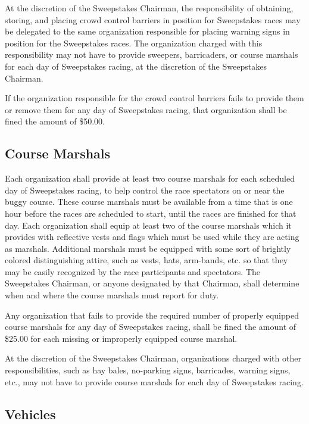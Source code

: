 	At the discretion of the Sweepstakes Chairman, the responsibility of obtaining, storing, and placing crowd control barriers in position for Sweepstakes races may be delegated to the same organization responsible for placing warning signs in position for the Sweepstakes races. The organization charged with this responsibility may not have to provide sweepers, barricaders, or course marshals for each day of Sweepstakes racing, at the discretion of the Sweepstakes Chairman.

	If the organization responsible for the crowd control barriers fails to provide them or remove them for any day of Sweepstakes racing, that organization shall be fined the amount of \$50.00.

\subsection{Course Marshals}
\label{subsec:Course Marshals}

	Each organization shall provide at least two course marshals for each scheduled day of Sweepstakes racing, to help control the race spectators on or near the buggy course. These course marshals must be available from a time that is one hour before the races are scheduled to start, until the races are finished for that day. Each organization shall equip at least two of the course marshals which it provides with reflective vests and flags which must be used while they are acting as marshals. Additional marshals must be equipped with some sort of brightly colored distinguishing attire, such as vests, hats, arm-bands, etc. so that they may be easily recognized by the race participants and spectators. The Sweepstakes Chairman, or anyone designated by that Chairman, shall determine when and where the course marshals must report for duty.

	Any organization that fails to provide the required number of properly equipped course marshals for any day of Sweepstakes racing, shall be fined the amount of \$25.00 for each missing or improperly equipped course marshal.

	At the discretion of the Sweepstakes Chairman, organizations charged with other responsibilities, such as hay bales, no-parking signs, barricades, warning signs, etc., may not have to provide course marshals for each day of Sweepstakes racing.

\subsection{Vehicles}

